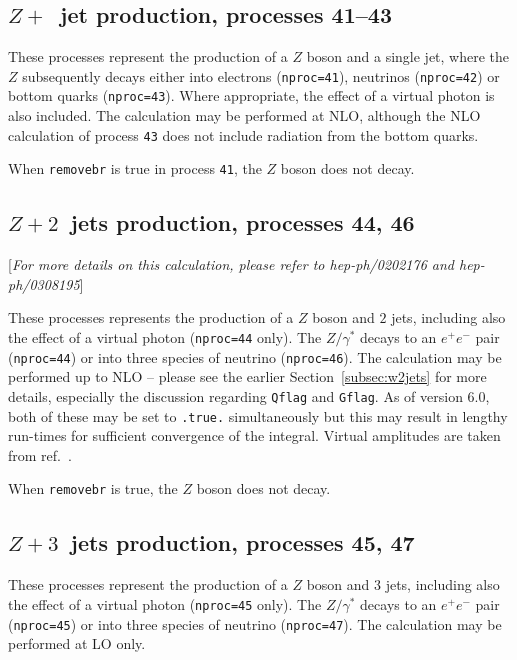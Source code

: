 \documentclass[12pt]{article}
\begin{document}
\subsection{$Z+$~jet production, processes 41--43}
\label{subsec:zjet}

These processes represent the production of a $Z$ boson and a single jet,
where the $Z$ subsequently
decays either into electrons ({\tt nproc=41}), neutrinos ({\tt nproc=42})
or bottom quarks ({\tt nproc=43}). Where appropriate, the effect of a virtual
photon is also included. The calculation may be performed at NLO,
although the NLO calculation of process {\tt 43} does not include radiation
from the bottom quarks.

When {\tt removebr} is true in process {\tt 41}, the $Z$ boson does not decay.

\subsection{$Z+2$~jets production, processes 44, 46}
\label{subsec:z2jets}

\begin{center}
[{\it For more details on this calculation, please refer to \break
 hep-ph/0202176 and hep-ph/0308195}]
\end{center}

These processes represents the production of a $Z$ boson and $2$ jets,
including also the effect of a virtual photon ({\tt nproc=44} only). The $Z/\gamma^*$ decays
to an $e^+ e^-$ pair ({\tt nproc=44}) or into three species of neutrino ({\tt nproc=46}).
The calculation may be performed up to NLO --
please see the earlier Section~\ref{subsec:w2jets} for more details,
especially the discussion regarding {\tt Qflag} and {\tt Gflag}.
As of version 6.0, both of these may be set to {\tt .true.} simultaneously but this
may result in lengthy run-times for sufficient convergence of the integral.
Virtual amplitudes are taken from ref.~\cite{Bern:1997sc}.

When {\tt removebr} is true, the $Z$ boson does not decay.


\subsection{$Z+3$~jets production, processes 45, 47}
\label{subsec:z3jets}

These processes represent the production of a $Z$ boson and $3$ jets,
including also the effect of a virtual photon ({\tt nproc=45} only). The $Z/\gamma^*$ decays
to an $e^+ e^-$ pair ({\tt nproc=45}) or into three species of neutrino ({\tt nproc=47}).
The calculation may be performed at LO only.
\end{document}
